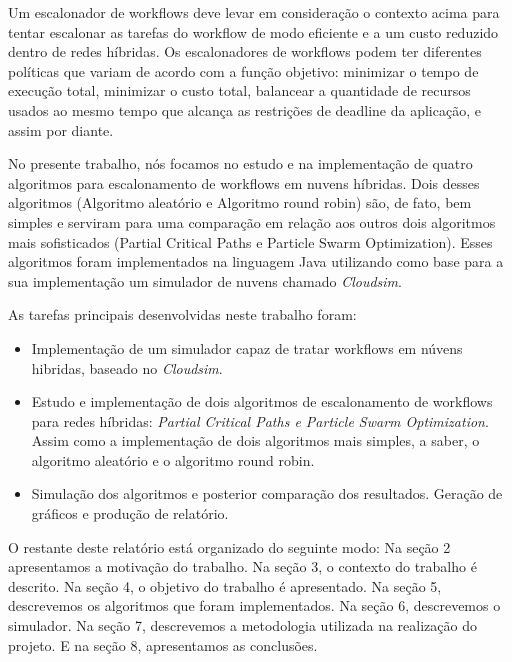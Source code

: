 \documentclass[a4paper,10pt]{article}
\begin{document}
Um escalonador de workflows deve levar em consideração o contexto acima para tentar escalonar as tarefas do workflow de modo 
eficiente e a um custo reduzido dentro de redes híbridas. Os escalonadores de workflows podem ter diferentes políticas que 
variam de acordo com a função objetivo: minimizar o tempo de execução total, minimizar o custo total, balancear a quantidade de recursos 
usados ao mesmo tempo que alcança as restrições de deadline da aplicação, e assim por diante.

No presente trabalho, nós focamos no estudo e na implementação de quatro algoritmos para escalonamento de workflows em nuvens híbridas. 
Dois desses algoritmos (Algoritmo aleatório e Algoritmo round robin) são, de fato, bem simples e serviram para uma comparação em relação aos outros dois 
algoritmos mais sofisticados (Partial Critical Paths e Particle Swarm Optimization). Esses algoritmos foram implementados na linguagem Java utilizando como base para 
a sua implementação um simulador de nuvens chamado \emph{Cloudsim}\cite{cloudsim}.

As tarefas principais desenvolvidas neste trabalho foram:

\begin{itemize}

\item Implementação de um simulador capaz de tratar workflows em núvens hibridas, baseado no \emph{Cloudsim}.

\item Estudo e implementação de dois algoritmos de escalonamento de workflows para redes híbridas: \emph{Partial Critical Paths e
Particle Swarm Optimization}. Assim como a implementação de dois algoritmos mais simples, a saber, o algoritmo aleatório e o 
algoritmo round robin.

\item Simulação dos algoritmos e posterior comparação dos resultados. Geração de gráficos e produção de relatório.

\end{itemize}


O restante deste relatório está organizado do seguinte modo: Na seção 2 apresentamos a motivação do trabalho. Na seção 3, o contexto 
do trabalho é descrito. Na seção 4, o objetivo do trabalho é apresentado. Na seção 5, descrevemos os algoritmos que foram implementados. 
Na seção 6, descrevemos o simulador. Na seção 7, descrevemos a metodologia utilizada na realização do projeto. E na seção 8, apresentamos as conclusões.
\end{document}
